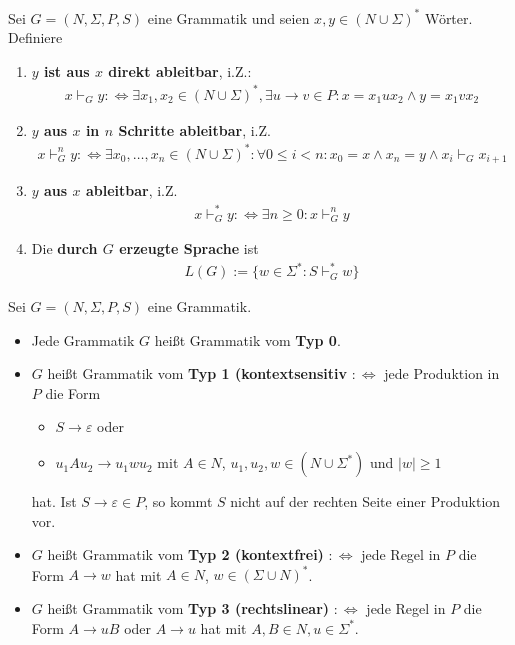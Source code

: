 \begin{definition}\label{def6.4}
	Sei $G=(N,\Sigma,P,S)$ eine Grammatik und seien $x,y\in(N\cup\Sigma)^\ast$ Wörter. Definiere
	\begin{enumerate}[label=\arabic*)]
		\item \textbf{$y$ ist aus $x$ direkt ableitbar}, i.Z.:
		\begin{align*}
			x\vdash_G y:\Longleftrightarrow\exists x_1,x_2\in (N\cup\Sigma)^\ast,\exists u\to v\in P: x=x_1 ux_2\wedge y=x_1 vx_2
		\end{align*}
		\item \textbf{$y$ aus $x$ in $n$ Schritte ableitbar}, i.Z.
		\begin{align*}
			x\vdash_G^n y:\Longleftrightarrow\exists x_0,\ldots,x_n\in (N\cup\Sigma)^\ast:\forall 0\leq i<n:x_0=x\wedge x_n=y\wedge x_i\vdash_G x_{i+1}
		\end{align*}
		\item \textbf{$y$ aus $x$ ableitbar}, i.Z.
		\begin{align*}
			x\vdash_G^\ast y:\Longleftrightarrow\exists n\geq 0:x\vdash_G^n y
		\end{align*}
		\item Die \textbf{durch $G$ erzeugte Sprache} ist
		\begin{align*}
			L(G):=\big\lbrace w\in\Sigma^\ast:S\vdash_G^\ast w\big\rbrace
		\end{align*}
	\end{enumerate}
\end{definition}

\begin{definition}\label{def6.6ChomskyHierarchie}\enter
	Sei $G=(N,\Sigma,P,S)$ eine Grammatik.
	\begin{itemize}
		\item Jede Grammatik $G$ heißt Grammatik vom \textbf{Typ 0}.
		\item $G$ heißt Grammatik vom \textbf{Typ 1 (kontextsensitiv} $:\Longleftrightarrow$ jede Produktion in $P$ die Form
		\begin{itemize}
			\item $S\to\varepsilon$ oder
			\item $u_1 Au_2\to u_1 wu_2$ mit $A\in N$, $u_1,u_2,w\in(N\cup\Sigma^\ast)$ und $|w|\geq1$
		\end{itemize}
		hat. Ist $S\to\varepsilon\in P$, so kommt $S$ nicht auf der rechten Seite einer Produktion vor.
		\item $G$ heißt Grammatik vom \textbf{Typ 2 (kontextfrei)} $:\Longleftrightarrow$ jede Regel in $P$ die Form $A\to w$ hat mit $A\in N$, $w\in(\Sigma\cup N)^\ast$.
		\item $G$ heißt Grammatik vom \textbf{Typ 3 (rechtslinear)} $:\Longleftrightarrow$ jede Regel in $P$ die Form $A\to uB$ oder $A\to u$ hat mit $A,B\in N,u\in\Sigma^\ast$.
	\end{itemize}
\end{definition}


